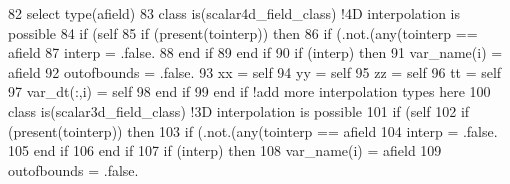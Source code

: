 \begin{DoxyCode}
82         \textcolor{keywordflow}{select type}(afield)
83 \textcolor{keywordflow}{        class is}(scalar4d\_field\_class)          \textcolor{comment}{!4D interpolation is possible}
84             \textcolor{keywordflow}{if} (self%
85                 \textcolor{keywordflow}{if} (\textcolor{keyword}{present}(tointerp)) \textcolor{keywordflow}{then}
86                     \textcolor{keywordflow}{if} (.not.(any(tointerp == afield%
87                         interp = .false.
88 \textcolor{keywordflow}{                    end if}
89 \textcolor{keywordflow}{                end if}
90                 \textcolor{keywordflow}{if} (interp) \textcolor{keywordflow}{then}
91                     var\_name(i) = afield%
92                     outofbounds = .false.
93                     xx = self%
94                     yy = self%
95                     zz = self%
96                     tt = self%
97                     var\_dt(:,i) = self%
98 \textcolor{keywordflow}{                end if}
99 \textcolor{keywordflow}{            end if} \textcolor{comment}{!add more interpolation types here}
100 \textcolor{keywordflow}{        class is}(scalar3d\_field\_class)          \textcolor{comment}{!3D interpolation is possible}
101             \textcolor{keywordflow}{if} (self%
102                 \textcolor{keywordflow}{if} (\textcolor{keyword}{present}(tointerp)) \textcolor{keywordflow}{then}
103                     \textcolor{keywordflow}{if} (.not.(any(tointerp == afield%
104                         interp = .false.
105 \textcolor{keywordflow}{                    end if}
106 \textcolor{keywordflow}{                end if}
107                 \textcolor{keywordflow}{if} (interp) \textcolor{keywordflow}{then}
108                     var\_name(i) = afield%
109                     outofbounds = .false.

\end{DoxyCode}
